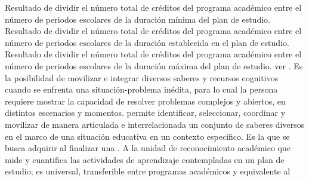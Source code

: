 \begin{bGlosario}
 	 Resultado de dividir el número total de créditos del programa académico entre el número de
	periodos escolares de la duración mínima del plan de estudio.
 	 Resultado de dividir el número total de créditos del programa académico entre el número
	de periodos escolares de la duración establecida en el plan de estudio.
 	 Resultado de dividir el número total de créditos del programa académico entre
	el número de periodos escolares de la duración máxima del plan de estudio.
 	 ver .
	  Es la posibilidad de movilizar e integrar diversos saberes y recursos cognitivos cuando se
	enfrenta una situación-problema inédita, para lo cual la persona requiere mostrar la capacidad de resolver problemas complejos y abiertos,
	en distintos escenarios y momentos. permite identificar, seleccionar, coordinar y movilizar de manera articulada e interrelacionada un
	conjunto de saberes diversos en el marco de una situación educativa en un contexto específico.
	 Es la  que se busca adquirir al finalizar una .
 	 A la unidad de reconocimiento académico que mide y cuantifica las actividades de
	aprendizaje contempladas en un plan de estudio; es universal, transferible entre programas académicos y equivalente al

\end{bGlosario}
